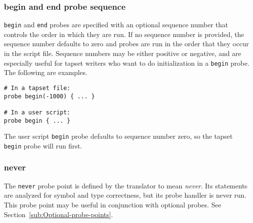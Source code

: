 \documentclass[twoside,english]{article}
\newenvironment{vindent}
{\begin{list}{}{\setlength{\listparindent}{6pt}}
\item[]}
{\end{list}}
\begin{document}
\subsubsection{begin and end probe sequence}
\texttt{begin} and \texttt{end} probes are specified with an optional sequence
number that controls the order in which they are run. If no sequence number
is provided, the sequence number defaults to zero and probes are run in the
order that they occur in the script file. Sequence numbers may be either
positive or negative, and are especially useful for tapset writers who want
to do initialization in a \texttt{begin} probe. The following are examples.

\begin{vindent}
\begin{verbatim}
# In a tapset file:
probe begin(-1000) { ... }

# In a user script:
probe begin { ... }
\end{verbatim}
\end{vindent}
The user script \texttt{begin} probe defaults to sequence number zero, so
the tapset \texttt{begin} probe will run first.


\subsubsection{never}
The \texttt{never} probe point is defined by the translator to mean \emph{never}.
Its statements are analyzed for symbol and type correctness, but its probe
handler is never run. This probe point may be useful in conjunction with
optional probes. See Section~\ref{sub:Optional-probe-points}.
\end{document}
